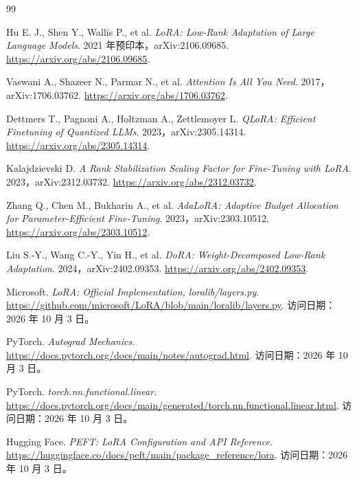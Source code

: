 \documentclass[UTF8,12pt,a4paper,fontset=fandol]{ctexart}
\begin{document}
\begin{thebibliography}{99}

Hu E. J., Shen Y., Wallis P., et al.
\emph{LoRA: Low-Rank Adaptation of Large Language Models}.
2021 年预印本，arXiv:2106.09685.
\url{https://arxiv.org/abs/2106.09685}.

Vaswani A., Shazeer N., Parmar N., et al.
\emph{Attention Is All You Need}.
2017，arXiv:1706.03762.
\url{https://arxiv.org/abs/1706.03762}.

Dettmers T., Pagnoni A., Holtzman A., Zettlemoyer L.
\emph{QLoRA: Efficient Finetuning of Quantized LLMs}.
2023，arXiv:2305.14314.
\url{https://arxiv.org/abs/2305.14314}.

Kalajdzievski D.
\emph{A Rank Stabilization Scaling Factor for Fine-Tuning with LoRA}.
2023，arXiv:2312.03732.
\url{https://arxiv.org/abs/2312.03732}.

Zhang Q., Chen M., Bukharin A., et al.
\emph{AdaLoRA: Adaptive Budget Allocation for Parameter-Efficient Fine-Tuning}.
2023，arXiv:2303.10512.
\url{https://arxiv.org/abs/2303.10512}.

Liu S.-Y., Wang C.-Y., Yin H., et al.
\emph{DoRA: Weight-Decomposed Low-Rank Adaptation}.
2024，arXiv:2402.09353.
\url{https://arxiv.org/abs/2402.09353}.

Microsoft.
\emph{LoRA: Official Implementation, loralib/layers.py}.
\url{https://github.com/microsoft/LoRA/blob/main/loralib/layers.py}.
访问日期：2026 年 10 月 3 日。

PyTorch.
\emph{Autograd Mechanics}.
\url{https://docs.pytorch.org/docs/main/notes/autograd.html}.
访问日期：2026 年 10 月 3 日。

PyTorch.
\emph{torch.nn.functional.linear}.
\url{https://docs.pytorch.org/docs/main/generated/torch.nn.functional.linear.html}.
访问日期：2026 年 10 月 3 日。

Hugging Face.
\emph{PEFT: LoRA Configuration and API Reference}.
\url{https://huggingface.co/docs/peft/main/package_reference/lora}.
访问日期：2026 年 10 月 3 日。

\end{thebibliography}
\end{document}
